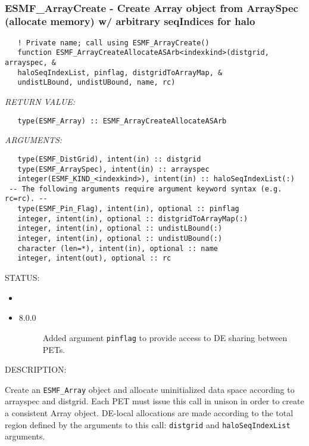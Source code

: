  
\mbox{}\hrulefill\ 
 
\subsubsection [ESMF\_ArrayCreate] {ESMF\_ArrayCreate - Create Array object from ArraySpec (allocate memory) w/ arbitrary seqIndices for halo}


  
\begin{verbatim}   ! Private name; call using ESMF_ArrayCreate()
   function ESMF_ArrayCreateAllocateASArb<indexkind>(distgrid, arrayspec, &
   haloSeqIndexList, pinflag, distgridToArrayMap, &
   undistLBound, undistUBound, name, rc)\end{verbatim}{\em RETURN VALUE:}
\begin{verbatim}   type(ESMF_Array) :: ESMF_ArrayCreateAllocateASArb\end{verbatim}{\em ARGUMENTS:}
\begin{verbatim}   type(ESMF_DistGrid), intent(in) :: distgrid
   type(ESMF_ArraySpec), intent(in) :: arrayspec
   integer(ESMF_KIND_<indexkind>), intent(in) :: haloSeqIndexList(:)
 -- The following arguments require argument keyword syntax (e.g. rc=rc). --
   type(ESMF_Pin_Flag), intent(in), optional :: pinflag
   integer, intent(in), optional :: distgridToArrayMap(:)
   integer, intent(in), optional :: undistLBound(:)
   integer, intent(in), optional :: undistUBound(:)
   character (len=*), intent(in), optional :: name
   integer, intent(out), optional :: rc\end{verbatim}
{\sf STATUS:}
   \begin{itemize}
   \item{}
   \item{}
   \begin{description}
   \item[8.0.0] Added argument {\tt pinflag} to provide access to DE sharing
   between PETs.
   \end{description}
   \end{itemize}
  
{\sf DESCRIPTION:\\ }


   Create an {\tt ESMF\_Array} object and allocate uninitialized data space
   according to arrayspec and distgrid. Each PET must issue this call in unison
   in order to create a consistent Array object. DE-local allocations are made
   according to the total region defined by the arguments to this call:
   {\tt distgrid} and {\tt haloSeqIndexList} arguments.
  
